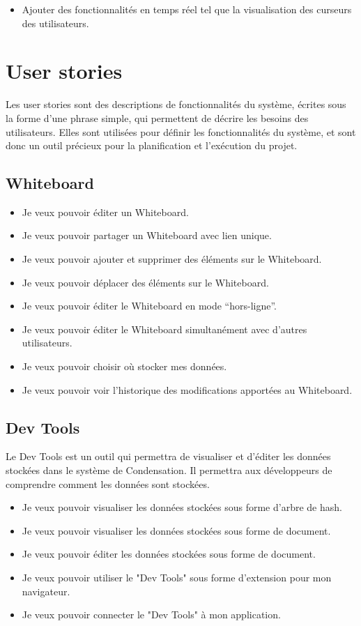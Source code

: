 \begin{itemize}
    \item Ajouter des fonctionnalités en temps réel tel que la visualisation des curseurs des utilisateurs.
\end{itemize}

\section*{User stories \label{sec:user-stories}}
Les user stories sont des descriptions de fonctionnalités du système, écrites sous la forme d'une phrase simple, qui permettent de décrire les besoins des utilisateurs. Elles sont utilisées pour définir les fonctionnalités du système, et sont donc un outil précieux pour la planification et l'exécution du projet.

\subsection*{Whiteboard}

\begin{itemize}
    \item Je veux pouvoir éditer un Whiteboard.
    \item Je veux pouvoir partager un Whiteboard avec lien unique.
    \item Je veux pouvoir ajouter et supprimer des éléments sur le Whiteboard.
    \item Je veux pouvoir déplacer des éléments sur le Whiteboard.
    \item Je veux pouvoir éditer le Whiteboard en mode “hors-ligne”.
    \item Je veux pouvoir éditer le Whiteboard simultanément avec d'autres utilisateurs.
    \item Je veux pouvoir choisir où stocker mes données.
    \item Je veux pouvoir voir l'historique des modifications apportées au Whiteboard.
\end{itemize}

\subsection*{Dev Tools}

Le Dev Tools est un outil qui permettra de visualiser et d'éditer les données stockées dans le système de Condensation. 
Il permettra aux développeurs de comprendre comment les données sont stockées.
\begin{itemize}
    \item  Je veux pouvoir visualiser les données stockées sous forme d'arbre de hash.
    \item  Je veux pouvoir visualiser les données stockées sous forme de document.
    \item  Je veux pouvoir éditer les données stockées sous forme de document.
    \item  Je veux pouvoir utiliser le "Dev Tools" sous forme d'extension pour mon navigateur.
    \item  Je veux pouvoir connecter le "Dev Tools" à mon application.
\end{itemize}

